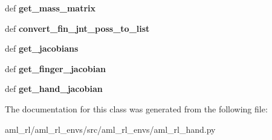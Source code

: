 \begin{DoxyCompactItemize}
\item 
\hypertarget{classaml__rl__envs_1_1aml__rl__hand_1_1_a_m_l_rl_hand_a0a798ae54d805a687b7bf75651549146}{def {\bfseries get\-\_\-mass\-\_\-matrix}}\label{classaml__rl__envs_1_1aml__rl__hand_1_1_a_m_l_rl_hand_a0a798ae54d805a687b7bf75651549146}

\item 
\hypertarget{classaml__rl__envs_1_1aml__rl__hand_1_1_a_m_l_rl_hand_aa4a3f422ea302a030d0da4c6b4ce5a5b}{def {\bfseries convert\-\_\-fin\-\_\-jnt\-\_\-poss\-\_\-to\-\_\-list}}\label{classaml__rl__envs_1_1aml__rl__hand_1_1_a_m_l_rl_hand_aa4a3f422ea302a030d0da4c6b4ce5a5b}

\item 
\hypertarget{classaml__rl__envs_1_1aml__rl__hand_1_1_a_m_l_rl_hand_a2b76a91f523deed7980ffc4c0810f2c9}{def {\bfseries get\-\_\-jacobians}}\label{classaml__rl__envs_1_1aml__rl__hand_1_1_a_m_l_rl_hand_a2b76a91f523deed7980ffc4c0810f2c9}

\item 
\hypertarget{classaml__rl__envs_1_1aml__rl__hand_1_1_a_m_l_rl_hand_ae6e354c16ecac259825363fa2b926346}{def {\bfseries get\-\_\-finger\-\_\-jacobian}}\label{classaml__rl__envs_1_1aml__rl__hand_1_1_a_m_l_rl_hand_ae6e354c16ecac259825363fa2b926346}

\item 
\hypertarget{classaml__rl__envs_1_1aml__rl__hand_1_1_a_m_l_rl_hand_ab1f45768940ab0b35a3920441d2e242a}{def {\bfseries get\-\_\-hand\-\_\-jacobian}}\label{classaml__rl__envs_1_1aml__rl__hand_1_1_a_m_l_rl_hand_ab1f45768940ab0b35a3920441d2e242a}

\end{DoxyCompactItemize}


The documentation for this class was generated from the following file\-:\begin{DoxyCompactItemize}
\item 
aml\-\_\-rl/aml\-\_\-rl\-\_\-envs/src/aml\-\_\-rl\-\_\-envs/aml\-\_\-rl\-\_\-hand.\-py\end{DoxyCompactItemize}

